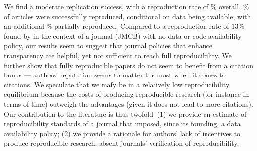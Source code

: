 %
%
We find a  moderate replication success, with a reproduction rate of $\%$ overall. $\%$ of articles were successfully reproduced, conditional on  data being available, with an additional $\%$ partially reproduced. Compared  to a reproduction rate of $13\%$ found by \textcite{Dewald1986} in the context of a journal (\ac{JMCB}) with no data or code availability policy, our results seem to suggest that journal policies that enhance transparency are helpful, yet not sufficient to reach full reproducibility. We further show that fully reproducible papers do not seem to benefit from a citation bonus ---  authors' reputation seems to matter the most when it comes to citations. We speculate that we mafy be in a relatively low reproducibility equilibrium because the costs of producing reproducible research (for instance in terms of time) outweigh the advantages (given it does not lead to more citations). Our contribution to the literature is thus twofold: (1) we provide an estimate of reproducibility standards of a journal that imposed, since its founding, a data availability policy; (2) we provide a rationale for authors' lack of incentives to produce reproducible research, absent journals' verification of reproducibility.







